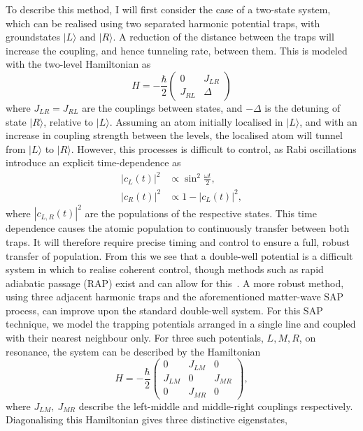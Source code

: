 To describe this method, I will first consider the case of a two-state system, which can be realised using two separated harmonic potential traps, with groundstates $| L \rangle$ and $| R \rangle$. A reduction of the distance between the traps will increase the coupling, and hence tunneling rate, between them. This is modeled with the two-level Hamiltonian as
\begin{equation}
    H = -\frac{\hbar}{2}
    \begin{pmatrix}
        0 & J_{LR} \\
        J_{RL} & \Delta
    \end{pmatrix}
\end{equation}
where $J_{LR} = J_{RL}$ are the couplings between states, and $-\Delta$ is the detuning of state $| R \rangle$, relative to $| L \rangle$. Assuming an atom initially localised in $| L \rangle$, and with an increase in coupling strength between the levels, the localised atom will tunnel from $| L \rangle$ to $| R \rangle $. However, this processes is difficult to control, as Rabi oscillations introduce an explicit time-dependence as
\begin{subequations}
\begin{align}
    |c_L(t)|^2 &\propto \sin^2 \frac{\omega t}{2} ,\\
    |c_R(t)|^2 &\propto 1 - |c_L(t)|^2,
\end{align}
\end{subequations}
where $|c_{L,R}(t)|^2$ are the populations of the respective states. This time dependence causes the atomic population to continuously transfer between both traps. It will therefore require precise timing and control to ensure a full, robust transfer of population. From this we see that a double-well potential is a difficult system in which to realise coherent control, though methods such as rapid adiabatic passage (RAP) exist and can allow for this~\cite{AO:Vitanov_arpc_2001}. A more robust method, using three adjacent harmonic traps and the aforementioned matter-wave SAP process, can improve upon the standard double-well system. For this SAP technique, we model the trapping potentials arranged in a single line and coupled with their nearest neighbour only. For three such potentials, $L,M,R$, on resonance, the system can be described by the Hamiltonian
\begin{equation}\label{eqn:sap_ham}
    H = -\frac{\hbar}{2}
    \begin{pmatrix}
        0 & J_{LM} & 0 \\
        J_{LM} & 0 & J_{MR} \\
        0 & J_{MR} & 0
    \end{pmatrix},
\end{equation}
where $J_{LM},~J_{MR}$ describe the left-middle and middle-right couplings respectively. Diagonalising this Hamiltonian gives three distinctive eigenstates,

